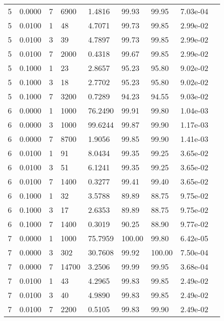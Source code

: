 \begin{longtable}{@{}lllllllll@{}}
5           & 0.0000 & 7   & 6900   & 1.4816  & 99.93   & 99.95   & 7.03e-04 &  \\
5           & 0.0100 & 1   & 48     & 4.7071  & 99.73   & 99.85   & 2.99e-02 &  \\
5           & 0.0100 & 3   & 39     & 4.7897  & 99.73   & 99.85   & 2.99e-02 &  \\
5           & 0.0100 & 7   & 2000   & 0.4318  & 99.67   & 99.85   & 2.99e-02 &  \\
5           & 0.1000 & 1   & 23     & 2.8657  & 95.23   & 95.80   & 9.02e-02 &  \\
5           & 0.1000 & 3   & 18     & 2.7702  & 95.23   & 95.80   & 9.02e-02 &  \\
5           & 0.1000 & 7   & 3200   & 0.7289  & 94.23   & 94.55   & 9.03e-02 &  \\
6           & 0.0000 & 1   & 1000   & 76.2490 & 99.91   & 99.80   & 1.04e-03 &  \\
6           & 0.0000 & 3   & 1000   & 99.6244 & 99.87   & 99.90   & 1.17e-03 &  \\
6           & 0.0000 & 7   & 8700   & 1.9056  & 99.85   & 99.90   & 1.41e-03 &  \\
6           & 0.0100 & 1   & 91     & 8.0434  & 99.35   & 99.25   & 3.65e-02 &  \\
6           & 0.0100 & 3   & 51     & 6.1241  & 99.35   & 99.25   & 3.65e-02 &  \\
6           & 0.0100 & 7   & 1400   & 0.3277  & 99.41   & 99.40   & 3.65e-02 &  \\
6           & 0.1000 & 1   & 32     & 3.5788  & 89.89   & 88.75   & 9.75e-02 &  \\
6           & 0.1000 & 3   & 17     & 2.6353  & 89.89   & 88.75   & 9.75e-02 &  \\
6           & 0.1000 & 7   & 1400   & 0.3019  & 90.25   & 88.90   & 9.77e-02 &  \\
7           & 0.0000 & 1   & 1000   & 75.7959 & 100.00  & 99.80   & 6.42e-05 &  \\
7           & 0.0000 & 3   & 302    & 30.7608 & 99.92   & 100.00  & 7.50e-04 &  \\
7           & 0.0000 & 7   & 14700  & 3.2506  & 99.99   & 99.95   & 3.68e-04 &  \\
7           & 0.0100 & 1   & 43     & 4.2965  & 99.83   & 99.85   & 2.49e-02 &  \\
7           & 0.0100 & 3   & 40     & 4.9890  & 99.83   & 99.85   & 2.49e-02 &  \\
7           & 0.0100 & 7   & 2200   & 0.5105  & 99.83   & 99.90   & 2.49e-02 &  \\

\end{longtable}
